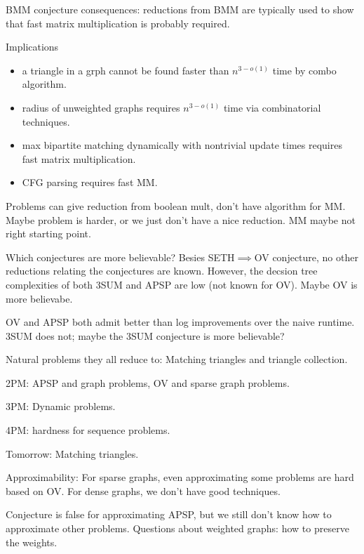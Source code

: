 
BMM conjecture consequences: reductions from BMM are typically used to show that fast matrix multiplication is probably required. 

Implications
\begin{itemize}
\item
a triangle in a grph cannot be found faster than $n^{3-o(1)}$ time by combo algorithm.
\item
radius of unweighted graphs requires $n^{3-o(1)}$ time via combinatorial techniques.
\item
max bipartite matching dynamically with nontrivial update times requires fast matrix multiplication.
\item CFG parsing requires fast MM.
\end{itemize}

Problems can give reduction from boolean mult, don't have algorithm for MM. Maybe problem is harder, or we just don't have a nice reduction. MM maybe not right starting point.

Which conjectures are more believable? %
Besies SETH$\implies$OV conjecture, no other reductions relating the conjectures are known. However, the decsion tree complexities of both 3SUM and APSP are low (not known for OV). Maybe OV is more believabe.

OV and APSP both admit better than log improvements over the naive runtime. 3SUM does not; maybe the 3SUM conjecture is more believable?

Natural problems they all reduce to: Matching triangles and triangle collection.



2PM: APSP and graph problems, OV and sparse graph problems.

3PM: Dynamic problems. %

4PM: hardness for sequence problems. 

Tomorrow: Matching triangles.

Approximability: For sparse graphs, even approximating some problems are hard based on OV. For dense graphs, we don't have good techniques. 

Conjecture is false for approximating APSP, but we still don't know how to approximate other problems. Questions about weighted graphs: how to preserve the weights. 

